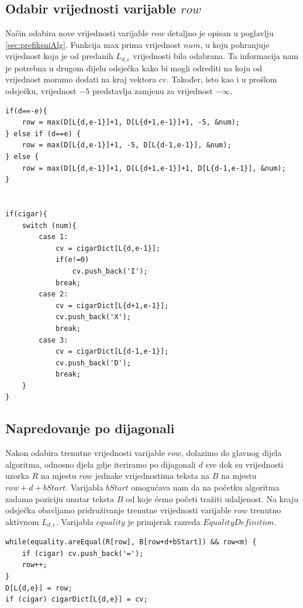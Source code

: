 \documentclass[times, utf8, zavrsni]{fer}
\begin{document}
\subsection{Odabir vrijednosti varijable $row$}
Način odabira nove vrijednosti varijable $row$ detaljno je opisan u poglavlju \ref{sec:prefiksniAlg}. Funkcija max prima vrijednost $num$, u koju pohranjuje vrijednost koja je od predanih $L_{d,e}$ vrijednosti bila odabrana. Ta informacija nam je potrebna u drugom dijelu odsječka kako bi mogli odrediti na koju od vrijednost moramo dodati na kraj vektora $cv$. Također, isto kao i u prošlom odsječku, vrijednost $-5$ predstavlja zamjenu za vrijednost $-\infty$.
\newline
\begin{lstlisting}
if(d==-e){
    row = max(D[L{d,e-1}]+1, D[L{d+1,e-1}]+1, -5, &num);
} else if (d==e) {
    row = max(D[L{d,e-1}]+1, -5, D[L{d-1,e-1}], &num);
} else {
    row = max(D[L{d,e-1}]+1, D[L{d+1,e-1}]+1, D[L{d-1,e-1}], &num);
}


if(cigar){
    switch (num){
        case 1:
            cv = cigarDict[L{d,e-1}];
            if(e!=0)
                cv.push_back('I');
            break;
        case 2:
            cv = cigarDict[L{d+1,e-1}];
            cv.push_back('X');
            break;
        case 3:
            cv = cigarDict[L{d-1,e-1}];
            cv.push_back('D');
            break;
    }
}
\end{lstlisting}

\subsection{Napredovanje po dijagonali}\label{ssec:diagonal}
Nakon odabira trenutne vrijednosti varijable $row$, dolazimo do glavnog dijela algoritma, odnosno djela gdje iteriramo po dijagonali $d$ sve dok su vrijednosti uzorka $R$ na mjestu $row$ jednake vrijednostima teksta na $B$ na mjestu $row+d+bStart$. Varijabla $bStart$ omogućava nam da na početku algoritma zadamo poziciju unutar teksta $B$ od koje ćemo početi tražiti udaljenost. Na kraju odsječka obavljamo pridruživanje trenutne vrijednosti varijable $row$ trenutno aktivnom $L_{d,e}$. Varijabla $equality$ je primjerak razreda $EqualityDefinition$.
\newline
\begin{lstlisting}
while(equality.areEqual(R[row], B[row+d+bStart]) && row<m) {
    if (cigar) cv.push_back('=');
    row++;
}
D[L{d,e}] = row;
if (cigar) cigarDict[L{d,e}] = cv;
\end{lstlisting}
\end{document}
